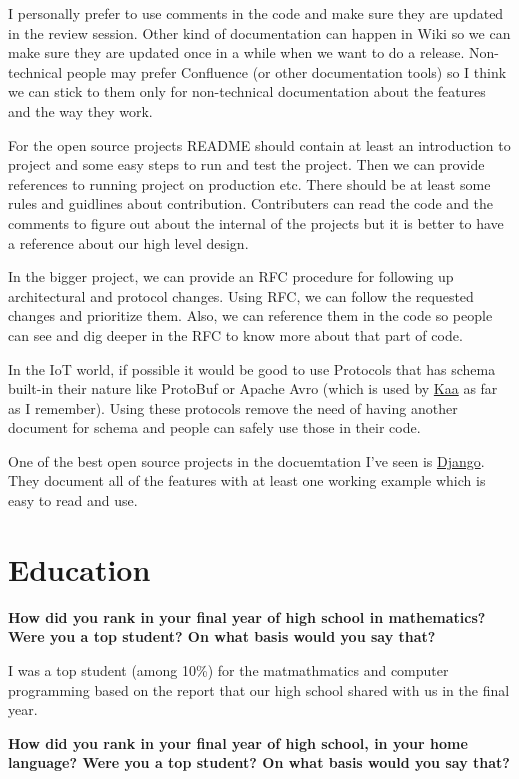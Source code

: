 I personally prefer to use comments in the code and make sure they are updated in the review session. Other kind of
documentation can happen in Wiki so we can make sure they are updated once in a while when we want to do a release.
Non-technical people may prefer Confluence (or other documentation tools) so I think we can stick to them only for
non-technical documentation about the features and the way they work.

For the open source projects README should contain at least an introduction to project and some easy steps to run
and test the project. Then we can provide references to running project on production etc. There should be at least
some rules and guidlines about contribution. Contributers can read the code and the comments to figure out about the
internal of the projects but it is better to have a reference about our high level design.

In the bigger project, we can provide an RFC procedure for following up architectural and protocol changes.
Using RFC, we can follow the requested changes and prioritize them. Also, we can reference them in the code
so people can see and dig deeper in the RFC to know more about that part of code.

In the IoT world, if possible it would be good to use Protocols that has schema built-in their nature like ProtoBuf or
Apache Avro (which is used by \href{https://github.com/kaaproject/kaa}{Kaa} as far as I remember). Using these protocols
remove the need of having another document for schema and people can safely use those in their code.

One of the best open source projects in the docuemtation I've seen is \href{https://docs.djangoproject.com/en/5.0/}{Django}.
They document all of the features with at least one working example which is easy to read and use.

\section{Education}

\noindent
\textbf{How did you rank in your final year of high school in mathematics? Were you a top student? On what basis would you say that?}

I was a top student (among 10\%) for the matmathmatics and computer programming based on the report that our high school
shared with us in the final year.

\noindent
\textbf{How did you rank in your final year of high school, in your home language? Were you a top student? On what basis would you say that?}

